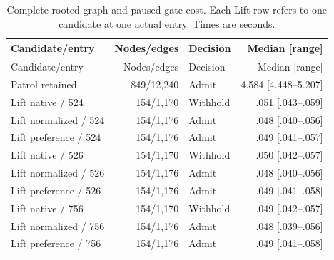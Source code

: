 \begin{center}\small
\begin{longtable}{@{}L{50mm}rL{28mm}r@{}}
\caption{Complete rooted graph and paused-gate cost. Each Lift row refers
to one candidate at one actual entry. Times are seconds.}
\label{tab:supp-runtime-gates}\\
\toprule Candidate/entry & Nodes/edges & Decision & Median [range]\\\midrule
\endfirsthead
\toprule Candidate/entry & Nodes/edges & Decision & Median [range]\\\midrule
\endhead
Patrol retained & 849/12,240 & Admit & 4.584 [4.448--5.207]\\
Lift native / 524 & 154/1,170 & Withhold & .051 [.043--.059]\\
Lift normalized / 524 & 154/1,176 & Admit & .048 [.040--.056]\\
Lift preference / 524 & 154/1,176 & Admit & .049 [.041--.057]\\
Lift native / 526 & 154/1,170 & Withhold & .050 [.042--.057]\\
Lift normalized / 526 & 154/1,176 & Admit & .048 [.040--.056]\\
Lift preference / 526 & 154/1,176 & Admit & .049 [.041--.058]\\
Lift native / 756 & 154/1,170 & Withhold & .049 [.042--.057]\\
Lift normalized / 756 & 154/1,176 & Admit & .048 [.039--.056]\\
Lift preference / 756 & 154/1,176 & Admit & .049 [.041--.058]\\\bottomrule
\end{longtable}
\end{center}

